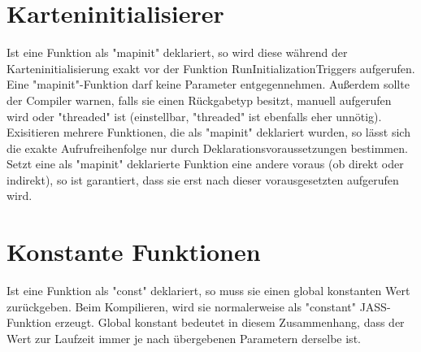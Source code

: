 \section{Karteninitialisierer}
Ist eine Funktion als "mapinit" deklariert, so wird diese während der Karteninitialisierung exakt vor der Funktion RunInitializationTriggers
aufgerufen. Eine "mapinit"-Funktion darf keine Parameter entgegennehmen. Außerdem sollte der Compiler warnen, falls sie einen Rückgabetyp besitzt,
manuell aufgerufen wird oder "threaded" ist (einstellbar, "threaded" ist ebenfalls eher unnötig).
Exisitieren mehrere Funktionen, die als "mapinit" deklariert wurden, so lässt sich die exakte Aufrufreihenfolge nur durch Deklarationsvoraussetzungen
bestimmen.
Setzt eine als "mapinit" deklarierte Funktion eine andere voraus (ob direkt oder indirekt), so ist garantiert, dass sie erst nach dieser vorausgesetzten
aufgerufen wird.

\section{Konstante Funktionen}
Ist eine Funktion als "const" deklariert, so muss sie einen global konstanten Wert zurückgeben. Beim Kompilieren, wird
sie normalerweise als "constant" JASS-Funktion erzeugt. Global konstant bedeutet in diesem Zusammenhang, dass der Wert
zur Laufzeit immer je nach übergebenen Parametern derselbe ist.